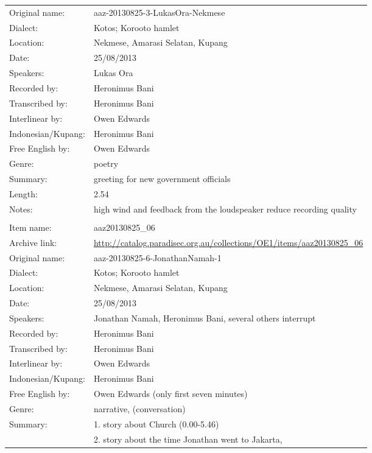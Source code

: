 \begin{longtable}{lL{.67\textwidth}}
Original name:			& aaz-20130825-3-LukasOra-Nekmese\\
Dialect:				& Kotos; Koro{\Q}oto hamlet \\
Location:				& Nekmese{\Q}, Amarasi Selatan, Kupang \\
Date:				& 25/08/2013\\
Speakers:				& Lukas Ora\\
Recorded by:			& Heronimus Bani\\
Transcribed by:		& Heronimus Bani\\
Interlinear by:		& Owen Edwards \\
Indonesian/Kupang:		& Heronimus Bani\\
Free English by:		& Owen Edwards\\
Genre:				& poetry\\
Summary:				& greeting for new government officials\\
Length:				& 2.54\\
Notes:				& high wind and feedback from the loudspeaker reduce recording quality\\ \lspbottomrule
{}			& \\
Item name:			& aaz20130825{\_}06\\
Archive link:			& \url{http://catalog.paradisec.org.au/collections/OE1/items/aaz20130825_06}\\
Original name:			& aaz-20130825-6-JonathanNamah-1\\
Dialect:				& Kotos; Koro{\Q}oto hamlet \\
Location:				& Nekmese{\Q}, Amarasi Selatan, Kupang \\
Date:				& 25/08/2013\\
Speakers:				& Jonathan Namah, Heronimus Bani, several others interrupt \\
Recorded by:			& Heronimus Bani\\
Transcribed by:		& Heronimus Bani\\
Interlinear by:		& Owen Edwards \\
Indonesian/Kupang:		& Heronimus Bani\\
Free English by:		& Owen Edwards (only first seven minutes)\\
Genre:				& narrative, (conversation)\\
Summary:				& 1. story about Church (0.00-5.46)\\
					& 2. story about the time Jonathan went to Jakarta,

\end{longtable}

